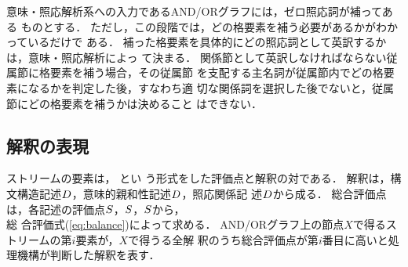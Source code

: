意味・照応解析系への入力であるAND/ORグラフには，ゼロ照応詞が補ってある
ものとする． 
ただし，この段階では，どの格要素を補う必要があるかがわかっているだけで
ある．
補った格要素を具体的にどの照応詞として英訳するかは，意味・照応解析によっ
て決まる．
関係節として英訳しなければならない従属節に格要素を補う場合，その従属節
を支配する主名詞が従属節内でどの格要素になるかを判定した後，すなわち適
切な関係詞を選択した後でないと，従属節にどの格要素を補うかは決めること
はできない．

\subsection{解釈の表現}
\label{sec:lazy:streamelem}

ストリームの要素は，
とい
う形式をした評価点と解釈の対である．
解釈は，構文構造記述$D_{}$，意味的親和性記述$D_{}$，照応関係記
述$D_{}$から成る．
総合評価点は，各記述の評価点$S_{}$，$S_{}$，$S_{}$から，\\総
合評価式(\ref{eq:balance})によって求める．
AND/ORグラフ上の節点$X$で得るストリームの第$i$要素が，$X$で得うる全解
釈のうち総合評価点が第$i$番目に高いと処理機構が判断した解釈を表す．

